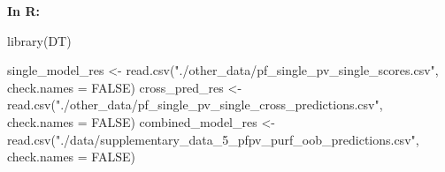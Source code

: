 \documentclass[
  11pt,
  oneside]{book}
\newenvironment{Shaded}{\begin{snugshade}}{\end{snugshade}}
\newcommand{\AttributeTok}[1]{\textcolor[rgb]{0.77,0.63,0.00}{#1}}
\newcommand{\ConstantTok}[1]{\textcolor[rgb]{0.00,0.00,0.00}{#1}}
\newcommand{\FunctionTok}[1]{\textcolor[rgb]{0.00,0.00,0.00}{#1}}
\newcommand{\NormalTok}[1]{#1}
\newcommand{\OtherTok}[1]{\textcolor[rgb]{0.56,0.35,0.01}{#1}}
\newcommand{\StringTok}[1]{\textcolor[rgb]{0.31,0.60,0.02}{#1}}
\begin{document}
\textbf{In R: }

\begin{Shaded}
\begin{Highlighting}[]
\FunctionTok{library}\NormalTok{(DT)}
\end{Highlighting}
\end{Shaded}

\begin{Shaded}
\begin{Highlighting}[]
\NormalTok{single\_model\_res }\OtherTok{\textless{}{-}} \FunctionTok{read.csv}\NormalTok{(}\StringTok{"./other\_data/pf\_single\_pv\_single\_scores.csv"}\NormalTok{, }\AttributeTok{check.names =} \ConstantTok{FALSE}\NormalTok{)}
\NormalTok{cross\_pred\_res }\OtherTok{\textless{}{-}} \FunctionTok{read.csv}\NormalTok{(}\StringTok{"./other\_data/pf\_single\_pv\_single\_cross\_predictions.csv"}\NormalTok{, }\AttributeTok{check.names =} \ConstantTok{FALSE}\NormalTok{)}
\NormalTok{combined\_model\_res }\OtherTok{\textless{}{-}} \FunctionTok{read.csv}\NormalTok{(}\StringTok{"./data/supplementary\_data\_5\_pfpv\_purf\_oob\_predictions.csv"}\NormalTok{, }\AttributeTok{check.names =} \ConstantTok{FALSE}\NormalTok{)}
\end{Highlighting}
\end{Shaded}
\end{document}
